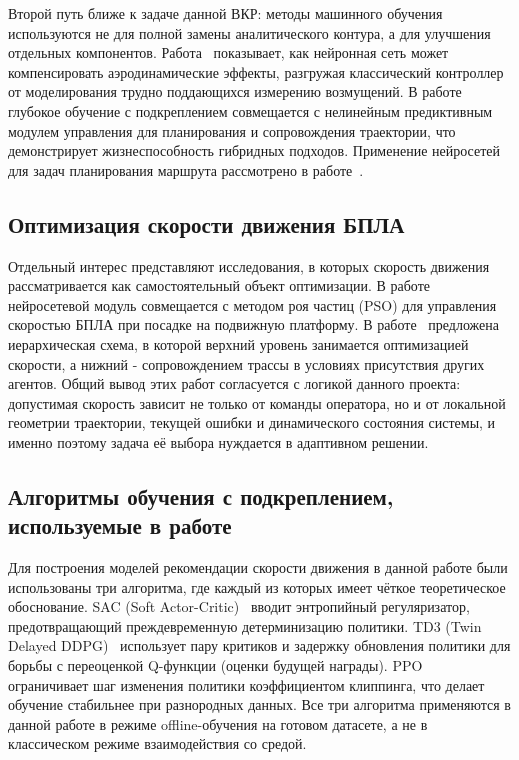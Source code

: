 Второй путь ближе к задаче данной ВКР: методы машинного обучения используются не для полной замены аналитического контура, а для улучшения отдельных компонентов.
Работа~\cite{madruga2021} показывает, как нейронная сеть может компенсировать аэродинамические эффекты, разгружая классический контроллер от моделирования трудно поддающихся измерению возмущений.
В работе~\cite{shi2025} глубокое обучение с подкреплением совмещается с нелинейным предиктивным модулем управления для планирования и сопровождения траектории, что демонстрирует жизнеспособность гибридных подходов.
Применение нейросетей для задач планирования маршрута рассмотрено в работе~\cite{akshya2024}.

\subsection{Оптимизация скорости движения БПЛА}

Отдельный интерес представляют исследования, в которых скорость движения рассматривается как самостоятельный объект оптимизации.
В работе~\cite{wu2023} нейросетевой модуль совмещается с методом роя частиц (PSO) для управления скоростью БПЛА при посадке на подвижную платформу.
В работе~\cite{wang2025} предложена иерархическая схема, в которой верхний уровень занимается оптимизацией скорости, а нижний - сопровождением трассы в условиях присутствия других агентов.
Общий вывод этих работ согласуется с логикой данного проекта: допустимая скорость зависит не только от команды оператора, но и от локальной геометрии траектории, текущей ошибки и динамического состояния системы, и именно поэтому задача её выбора нуждается в адаптивном решении.

\subsection{Алгоритмы обучения с подкреплением, используемые в работе}

Для построения моделей рекомендации скорости движения в данной работе были использованы три алгоритма, где каждый из которых имеет чёткое теоретическое обоснование.
SAC (Soft Actor-Critic)~\cite{haarnoja2018sac} вводит энтропийный регуляризатор, предотвращающий преждевременную детерминизацию политики.
TD3 (Twin Delayed DDPG)~\cite{fujimoto2018td3} использует пару критиков и задержку обновления политики для борьбы с переоценкой Q-функции (оценки будущей награды).
PPO~\cite{schulman2017ppo} ограничивает шаг изменения политики коэффициентом клиппинга, что делает обучение стабильнее при разнородных данных.
Все три алгоритма применяются в данной работе в режиме offline-обучения на готовом датасете, а не в классическом режиме взаимодействия со средой.

